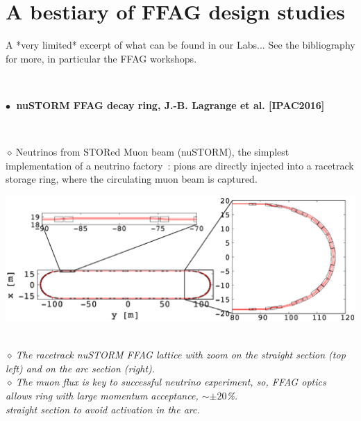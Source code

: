 \documentclass[12pt]{article}
\newcommand{\nib}{\noindent \ensuremath{\bullet~}}
\newcommand{\nid}{\noindent \ensuremath{\diamond~}}
\newcommand{\blue}{\color{blue}}
\begin{document}
\begin{minipage}{.3499\linewidth}
\begin{minipage}{1.\linewidth}



\end{minipage}
\end{minipage}




\clearpage 

\Large 

\section{\LARGE A bestiary of FFAG design studies  }

 A *very limited* excerpt of what can be found in our Labs... See the bibliography for more, in particular the FFAG workshops.

~

{\fontsize{17}{24} \selectfont

 {\bf \blue \nib
nuSTORM FFAG decay ring, J.-B. Lagrange et al. [IPAC2016]
}

~

\nid Neutrinos from STORed Muon  beam (nuSTORM), the simplest implementation of a neutrino factory~:
 pions are directly injected into a racetrack storage ring, where the circulating muon beam is captured. 

\includegraphics[width=.75\linewidth]{./figs_FFAG_introSlides/nuStorm.eps} 

\textsl{ ~ \\
\nid The racetrack nuSTORM FFAG lattice with  zoom on the straight section (top left)
and  on the arc section (right). \\
\nid The muon flux  is  key to successful
neutrino experiment, so, FFAG optics allows ring with large momentum
 acceptance,  $\sim \pm 20$\%. \\
 straight section to avoid activation in the arc. 
}

}%


\clearpage
\end{document}
